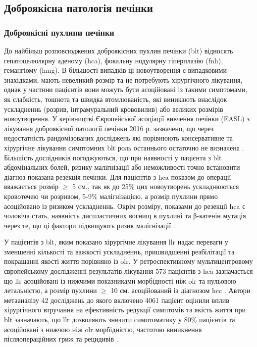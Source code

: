 \begin{refsection}
\subsection{Доброякісна патологія печінки}

\subsubsection{Доброякісні пухлини печінки}

До найбільш розповсюджених доброякісних пухлин печінки (\acrshort{blt}) відносять гепатоцелюлярну аденому (\acrshort{hca}), фокальну нодулярну гіперплазію (\acrshort{fnh}), гемангіому (\acrshort{hmg}). В більшості випадків ці новоутворення є випадковими знахідками, мають невеликий розмір та не потребують хірургічного лікування, однак у частини пацієнтів вони можуть бути асоційовані із такими симптомами, як слабкість, тошнота та швидка втомлюваність, які виникають внаслідок ускладненнь (розрив, інтрамуральний крововилив) або великих розмірів новоутворення. У керівництві Європейської асоціації вивчення печінки (EASL) з лікування доброякісної патології печінки 2016 р. зазначено, що через недостатність рандомізованих досліджень які порівнюють консервативне та хірургічне лікування симптомних \acrshort{blt} роль останнього остаточно не визначена \cite{Colombo2016}. Більшість дослідників погоджуються, що при наявності у пацієнта з \acrshort{blt} абдомінальних болей, ризику малігнізації або неможливості точно встановити діагноз показана резекція печінки. Для пацієнтів з \acrshort{hca} показом до операції вважається розмір $\geq$ 5 см., так як до 25\% цих новоутворень ускладнюються кровотечею чи розривом, 5-9\% малігнізацією, а розмір пухлини прямо асоційовано із ризиком ускладненнь. Окрім розміру, показами до резекції \acrshort{hca} є чоловіча стать, наявність диспластичних вогнищ в пухлині та  β-катенін мутація через те, що ці фактори підвищують ризик малігнізації \cite{Ercolani2015}.

У пацієнтів з \acrshort{blt}, яким показано хірургічне лікування \acrshort{llr} надає переваги у зменшенні кількості та важкості ускладненнь, пришвидшенні реабілітації та покращанні якості життя порівняно із \acrshort{olr}. У ретроспективному мультицентровому європейському дослідженні результатів лікування 573 пацієнтів з \acrshort{hca} зазначається що \acrshort{llr} асоційовані із нижчими показниками морбідності ніж \acrshort{olr} та нульовою летальністю, а розмір пухлини $\geq$ 10 см. асоційований із діагнозом \acrshort{hcc} \cite{Laurent2016}. Автори метааналізу 42 досліджень до якого включено 4061 пацієнт оцінили вплив хірургічного втручання на ефективність редукції симптомів та якість життя при \acrshort{blt} зазначають, що \acrshort{llr} дозволяють знизити симптоматику у 80\% пацієнтів та асоційовані з нижчою ніж \acrshort{olr} морбідністю, частотою виникнення післяопераційних гриж та рецидивів \cite{VanRosmalen2019}. 


\end{refsection}
